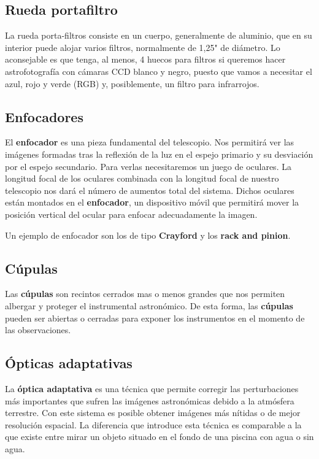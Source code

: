 \subsection{Rueda portafiltro}

La rueda porta-filtros consiste en un cuerpo, generalmente de aluminio, que en su interior puede alojar varios filtros, normalmente de 1,25" de diámetro. Lo aconsejable es que tenga, al menos, 4 huecos para filtros si queremos hacer astrofotografía con cámaras CCD blanco y negro, puesto que vamos a necesitar el azul, rojo y verde (RGB) y, posiblemente, un filtro para infrarrojos.

\subsection{Enfocadores}

El \textbf{enfocador} es una pieza fundamental del telescopio. Nos permitirá ver las imágenes formadas tras la reflexión de la luz en el espejo primario y su desviación por el espejo secundario. Para verlas necesitaremos un juego de oculares. La longitud focal de los oculares combinada con la longitud focal de nuestro telescopio nos dará el número de aumentos total del sistema. Dichos oculares están montados en el \textbf{enfocador}, un dispositivo móvil que permitirá mover la posición vertical del ocular para enfocar adecuadamente la imagen.

\bigskip
Un ejemplo de enfocador son los de tipo \textbf{Crayford} y los \textbf{rack and pinion}.

\subsection{Cúpulas}
Las \textbf{cúpulas} son recintos cerrados mas o menos grandes que nos permiten albergar y proteger el instrumental astronómico. De esta forma, las \textbf{cúpulas} pueden ser abiertas o cerradas para exponer los instrumentos en el momento de las observaciones.

\subsection{Ópticas adaptativas}

La \textbf{óptica adaptativa} es una técnica que permite corregir las perturbaciones más importantes que sufren las imágenes astronómicas debido a la atmósfera terrestre. Con este sistema es posible obtener imágenes más nítidas o de mejor resolución espacial. La diferencia que introduce esta técnica es comparable a la que existe entre mirar un objeto situado en el fondo de una piscina con agua o sin agua.

